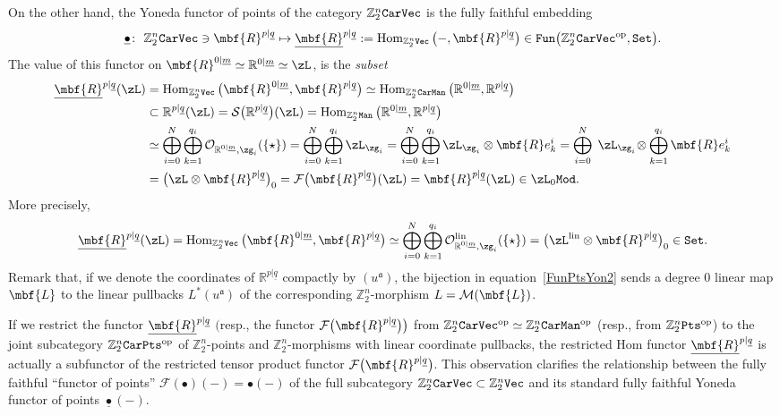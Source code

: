 \documentclass[10pt,a4paper]{amsart}
\newcommand{\op}[1]{\operatorname{#1}}
\newcommand{\R}{{\mathbb R}}
\newcommand{\Z}{{\mathbb Z}}
\def\ul{\underline}
\def\cM{\cal M}
\def\cO{\mathcal{O}}
\def\cF{\mathcal{F}}
\def\cM{\mathcal{M}}
\def\ul{\underline}
\newcommand{\0}{\otimes}
\newcommand{\z}{\Z_2^n}
\numberwithin{equation}{section}
\providecommand{\cal}{\mathcal}
\begin{document}
On the other hand, the Yoneda functor of points of the category $\z\tt CarVec$ is the fully faithful embedding
\[
\ul\bullet\colon\ \z{\tt CarVec}\ni\mbf{R}^{p|\ul q}\mapsto \ul{\mbf{R}}^{p|\ul q}:=\op{Hom}_{\z\tt Vec}\big({-},\mbf{R}^{p|\ul q}\big)\in{\tt Fun}\big(\z{\tt CarVec}^{\op{op}},\tt Set\big).
\]
The value of this functor on $\mbf{R}^{0|\ul m}\simeq\R^{0|\ul m}\simeq\zL$, is the {\it subset}
\begin{align}
\ul{\mbf{R}}^{p|\ul q}(\zL)&=\op{Hom}_{\z\tt Vec}\big(\mbf{R}^{0|\ul m},\mbf{R}^{p|\ul q}\big)\simeq\op{Hom}_{\z\tt CarMan}\big(\R^{0|\ul m},\R^{p|\ul q}\big)\nonumber
\\
&\subset\R^{p|\ul q}(\zL)=\mathcal{S}\big(\R^{p|\ul q}\big)(\zL)
=\op{Hom}_{\z\tt Man}\big(\R^{0|\ul m},\R^{p|\ul q}\big) \nonumber \\
&\simeq\bigoplus_{i=0}^{N}\bigoplus_{k=1}^{q_i}\cO_{\R^{0|\ul m},\zg_i}(\{\star\})=\bigoplus_{i=0}^{N}\bigoplus_{k=1}^{q_i}\zL_{\zg_i} =\bigoplus_{i=0}^{N}\bigoplus_{k=1}^{q_i}\zL_{\zg_i}\0\mbf{R} e^i_k =\bigoplus_{i=0}^{N}\;\zL_{\zg_i}\!\0\bigoplus_{k=1}^{q_i}\mbf{R} e^i_k\nonumber
\\
&=
\big(\zL\0\mbf{R}^{p|\ul q}\big)_0=\cF\big(\mbf{R}^{p|\ul q}\big)(\zL)=\mbf{R}^{p|\ul q}(\zL)\in\zL_0\tt Mod.
\label{FunPtsYon1}
\end{align}
More precisely,
\begin{gather}\label{FunPtsYon2}
\ul{\mbf{R}}^{p|\ul q}(\zL)=\op{Hom}_{\z\tt Vec}\big(\mbf{R}^{0|\ul m},\mbf{R}^{p|\ul q}\big)\simeq \bigoplus_{i=0}^{N}\bigoplus_{k=1}^{q_i}\cO^{\op{lin}}_{\R^{0|\ul m},\zg_i}(\{\star\})=\big(\zL^{\op{lin}}\0\mbf{R}^{p|\ul q}\big)_0\in\tt Set.
\end{gather}
Remark that, if we denote the coordinates of $\R^{p|\ul q}$ compactly by $(u^{\mathfrak a})$, the bijection in equation~\eqref{FunPtsYon2} sends a degree 0 linear map $\mbf{L}$ to the linear pullbacks $L^*(u^{\mathfrak a})$ of the corresponding $\z$-morphism $L=\cM(\mbf{L})$.

\begin{Remark}
If we restrict the functor $\ul{\mbf{R}}^{p|\ul q}$ $\big($resp., the functor $\cF\big(\mbf{R}^{p|\ul q}\big)\big)$ from $\z{\tt CarVec}^{\op{op}}\simeq\z{\tt CarMan}^{\op{op}}$ (resp., from $\z\tt Pts^{\op{op}}$) to the joint subcategory $\z\tt Car Pts^{\op{op}}$ of $\z$-points and $\z$-morphisms with linear coordinate pullbacks, the restricted Hom functor $\ul{\mbf{R}}^{p|\ul q}$ is actually a subfunctor of the restricted tensor product functor $\cF\big(\mbf{R}^{p|\ul q}\big)$. This observation clarifies the relationship between the fully faithful ``functor of points'' $\cF(\bullet)(-)=\bullet(-)$ of the full subcategory $\z{\tt CarVec}\subset\z\tt Vec$ and its standard fully faithful Yoneda functor of points $\ul\bullet(-)$.
\end{Remark}
\end{document}
